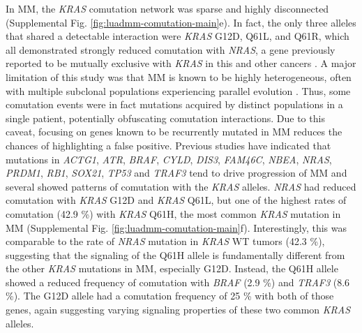 \documentclass[english, 10pt, letterpaper]{article}
\newcommand{\KRAS}{\emph{KRAS}}
\begin{document}
In MM, the \KRAS{} comutation network was sparse and highly disconnected (Supplemental Fig. \ref{fig:luadmm-comutation-main}e).
In fact, the only three alleles that shared a detectable interaction were \KRAS{} G12D, Q61L, and Q61R, which all demonstrated strongly reduced comutation with \emph{NRAS}, a gene previously reported to be mutually exclusive with \KRAS{} in this and other cancers \cite{Lohr2014WidespreadTherapy.}.
A major limitation of this study was that MM is known to be highly heterogeneous, often with multiple subclonal populations experiencing parallel evolution \cite{Melchor2014Single-cellMyeloma., Lionetti2015MolecularActivation., Keats2012ClonalMyeloma., Corre2015GeneticsLevel, Lohr2016GeneticResolution., Lohr2014WidespreadTherapy., Xu2017MolecularActivation.}.
Thus, some comutation events were in fact mutations acquired by distinct populations in a single patient, potentially obfuscating comutation interactions.
Due to this caveat, focusing on genes known to be recurrently mutated in MM reduces the chances of highlighting a false positive. 
Previous studies have indicated that mutations in \emph{ACTG1}, \emph{ATR}, \emph{BRAF}, \emph{CYLD}, \emph{DIS3}, \emph{FAM46C}, \emph{NBEA}, \emph{NRAS}, \emph{PRDM1}, \emph{RB1}, \emph{SOX21}, \emph{TP53} and \emph{TRAF3} tend to drive progression of MM \cite{Lohr2014WidespreadTherapy., Sondka2018} and several showed patterns of comutation with the \KRAS{} alleles.
\emph{NRAS} had reduced comutation with \KRAS{} G12D and \KRAS{} Q61L, but one of the highest rates of comutation (42.9 \%) with \KRAS{} Q61H, the most common \KRAS{} mutation in MM (Supplemental Fig. \ref{fig:luadmm-comutation-main}f).
Interestingly, this was comparable to the rate of \emph{NRAS} mutation in \KRAS{} WT tumors (42.3 \%), suggesting that the signaling of the Q61H allele is fundamentally different from the other \KRAS{} mutations in MM, especially G12D.
Instead, the Q61H allele showed a reduced frequency of comutation with \emph{BRAF} (2.9 \%) and \emph{TRAF3} (8.6 \%).
The G12D allele had a comutation frequency of 25 \% with both of those genes, again suggesting varying signaling properties of these two common \KRAS{} alleles.
\end{document}
